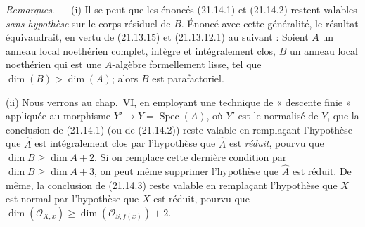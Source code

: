 \begin{env}[21.14.4]
\label{IV.21.14.4}
\emph{Remarques}. ---
(i) Il se peut que les énoncés (21.14.1) et (21.14.2) restent valables \emph{sans
hypothèse} sur le corps résiduel de $B$. Énoncé avec cette généralité, le résultat
équivaudrait, en vertu de (21.13.15) et (21.13.12.1) au suivant : Soient $A$ un
anneau local noethérien complet, intègre et intégralement clos, $B$ un anneau local
noethérien qui est une $A$-algèbre formellement lisse, tel que
$\dim(B)>\dim(A)$; alors $B$ est parafactoriel.

(ii) Nous verrons au chap.~VI, en employant une technique de « descente finie »
appliquée au morphisme $Y'\to Y=\operatorname{Spec}(A)$, où $Y'$ est le normalisé de
$Y$, que la conclusion de (21.14.1) (ou de (21.14.2)) reste valable en remplaçant
l'hypothèse que $\widehat A$ est intégralement clos par l'hypothèse que
$\widehat A$ est \emph{réduit}, pourvu que $\dim B\geq\dim A+2$. Si on remplace cette
dernière condition par $\dim B\geq\dim A+3$, on peut même supprimer l'hypothèse que
$\widehat A$ est réduit. De même, la conclusion de (21.14.3) reste valable en
remplaçant l'hypothèse que $X$ est normal par l'hypothèse que $X$ est réduit, pourvu
que $\dim(\mathcal O_{X,x})\geq\dim(\mathcal O_{S,f(x)})+2$.


\end{env}

